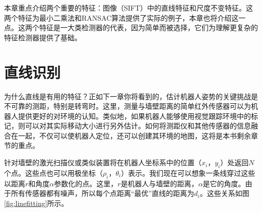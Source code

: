 本章重点介绍两个重要的特征：图像（SIFT）中的直线特征和尺度不变特征。这两个特征为最小二乘法和RANSAC算法提供了实际的例子，本章也将介绍这一点。这两个特征是一大类检测器的代表，因为简单而被选择，它们为理解更复杂的特征检测器提供了基础。


\section{直线识别}


为什么直线是有用的特征？正如下一章你将看到的，估计机器人姿势的关键挑战是不可靠的测距，特别是转弯时。这里，测量与墙壁距离的简单红外传感器可以为机器人提供更好的对环境的认知。类似地，如果机器人能够使用视觉跟踪环境中的标记，则可以对其实际移动大小进行另外估计。如何将测距仪和其他传感器的信息融合在一起，不仅可以使机器人定位，还可以创建其环境的地图，这将是本书剩余章节的重点。


针对墙壁的激光扫描仪或类似装置将在机器人坐标系中的位置$（x_i，y_i）$处返回$N$个点。这些点也可以用极坐标$（\rho_i，\theta_i）$表示。我们现在可以想象一条线穿过这些以距离$r$和角度$\alpha$参数化的点。这里，$r$是机器人与墙壁的距离，$\alpha$是它的角度。由于所有传感器都有噪声，所以每个点距离“最优”直线的距离为$d_i$。这些关系如图\ref{fig:linefitting}所示。

